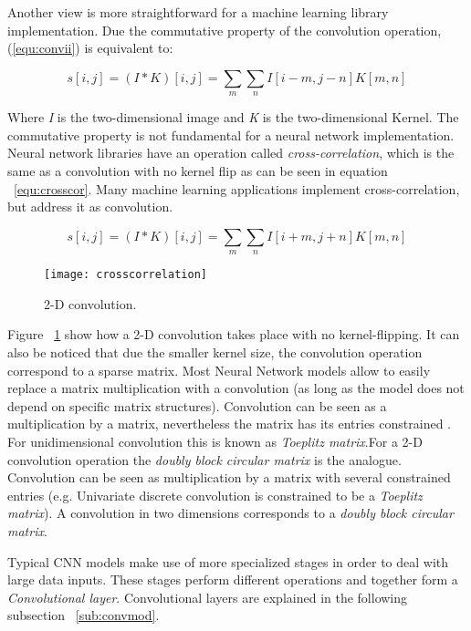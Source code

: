 Another view is more straightforward for a machine learning library implementation. Due the commutative property of the convolution operation, (\ref{equ:convii}) is equivalent to:

\begin{equation}
 s[i,j] = (I \ast K)[i,j] = \sum_{m} \sum_{n}I[i-m,j-n]K[m,n]
 \label{equ:convoo}
\end{equation}

Where \textit{I} is the two-dimensional image and \textit{K} is the two-dimensional Kernel.
The commutative property is not fundamental for a neural network implementation. Neural network libraries have an operation called \textit{cross-correlation}, which is the same as a convolution with no kernel flip as can be seen in equation ~\ref{equ:crosscor}. Many machine learning applications implement cross-correlation, but address it as convolution.

\begin{equation}
 s[i,j] = (I \ast K)[i,j] = \sum_{m} \sum_{n}I[i+m,j+n]K[m,n]
 \label{equ:crosscor}
\end{equation}

\begin{figure}
 \centering
 \texttt{[image: crosscorrelation]}
 \caption{2-D convolution.}
 \label{fig:crosscor}
\end{figure}

Figure ~\ref{fig:crosscor} show how a 2-D convolution takes place with no kernel-flipping. It can also be noticed that due the smaller kernel size, the convolution operation correspond to a sparse matrix. Most Neural Network models allow to easily replace a matrix multiplication with a convolution (as long as the model does not depend on specific matrix structures).
Convolution can be seen as a multiplication by a matrix, nevertheless the matrix has its entries constrained . For unidimensional convolution this is known as \textit{Toeplitz matrix}.For a 2-D convolution operation the \textit{doubly block circular matrix} is the analogue.  
Convolution can be seen as multiplication by a matrix with several constrained entries (e.g. Univariate discrete convolution is constrained to be a \textit{Toeplitz matrix}).
A convolution in two dimensions corresponds to a \textit{doubly block circular matrix}. 

Typical CNN models make use of more specialized stages in order to deal with large data inputs. These stages perform different operations and together form a \textit{Convolutional layer}. Convolutional layers are explained in the following subsection ~\ref{sub:convmod}.

